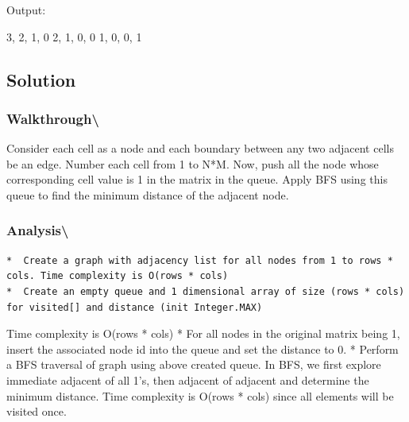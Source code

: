 \documentclass[]{book}
\newenvironment{Shaded}{\begin{snugshade}}{\end{snugshade}}
\newcommand{\DecValTok}[1]{\textcolor[rgb]{0.00,0.00,0.81}{#1}}
\newcommand{\NormalTok}[1]{#1}
\begin{document}
Output:

\begin{Shaded}
\begin{Highlighting}[]
\DecValTok{3}\NormalTok{, }\DecValTok{2}\NormalTok{, }\DecValTok{1}\NormalTok{, }\DecValTok{0}
\DecValTok{2}\NormalTok{, }\DecValTok{1}\NormalTok{, }\DecValTok{0}\NormalTok{, }\DecValTok{0}
\DecValTok{1}\NormalTok{, }\DecValTok{0}\NormalTok{, }\DecValTok{0}\NormalTok{, }\DecValTok{1}
\end{Highlighting}
\end{Shaded}

\hypertarget{solution-58}{%
\subsection{Solution}\label{solution-58}}

\hypertarget{walkthrough-92}{%
\subsubsection{Walkthrough\textbackslash{}}\label{walkthrough-92}}

Consider each cell as a node and each boundary between any two adjacent cells be an edge. Number each cell from 1 to
N*M. Now, push all the node whose corresponding cell value is 1 in the matrix in the queue. Apply BFS using this queue
to find the minimum distance of the adjacent node.

\hypertarget{analysis-99}{%
\subsubsection{Analysis\textbackslash{}}\label{analysis-99}}

\begin{verbatim}
*  Create a graph with adjacency list for all nodes from 1 to rows * cols. Time complexity is O(rows * cols)
*  Create an empty queue and 1 dimensional array of size (rows * cols) for visited[] and distance (init Integer.MAX)
\end{verbatim}

Time complexity is O(rows * cols)
* For all nodes in the original matrix being 1, insert the associated node id into the queue and set the
distance to 0.
* Perform a BFS traversal of graph using above created queue. In BFS, we first explore immediate adjacent of all
1's, then adjacent of adjacent and determine the minimum distance. Time complexity is O(rows * cols) since all elements
will be visited once.
\end{document}
